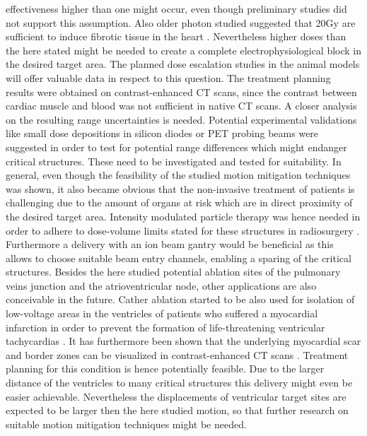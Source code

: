 \documentclass[type=dr, dr=rernat, accentcolor=tud7b,colorbacktitle, bigchapter, openright, twoside, 12pt ]{tudthesis}
\begin{document}
effectiveness higher than one might occur, even though preliminary studies did not support this assumption. Also older photon studied 
suggested that 20Gy are sufficient to induce fibrotic tissue in the heart \cite{Faj70} \cite{Faj73}. 
Nevertheless higher doses than the here stated might be needed to create a complete electrophysiological block in the desired 
target area. The planned dose escalation studies in the animal models will offer valuable data in respect to this question. 
The treatment planning results were obtained on contrast-enhanced CT scans, since the contrast between cardiac muscle 
and blood was not sufficient in native CT scans. A closer analysis on the resulting range uncertainties is needed. Potential 
experimental validations like small dose depositions in silicon diodes \cite{Ben12} or PET probing beams \cite{Lin12} were suggested in order to 
test for potential range differences which might endanger critical structures. These need to be investigated and tested for suitability.\newline
\newline
In general, even though the feasibility of the studied motion mitigation techniques was shown, it also became obvious that the non-invasive 
treatment of patients is challenging due to the amount of organs at risk which are in direct proximity of the desired target area. 
Intensity modulated particle therapy was hence needed in order to adhere to dose-volume limits stated for these structures in radiosurgery \cite{RTOG0631} 
\cite{RTOG0915}. Furthermore a delivery with an ion beam gantry would be beneficial as this allows to choose suitable beam entry channels, 
enabling a sparing of the critical structures.
\newpage
Besides the here studied potential ablation sites of the pulmonary veins junction and the atrioventricular node, other applications are also 
conceivable in the future. Cather ablation started to be also used for isolation of low-voltage areas in the ventricles of patients who 
suffered a myocardial infarction in order to prevent the formation of life-threatening ventricular tachycardias \cite{Til14} \cite{Mad14}. 
It has furthermore been shown that the underlying myocardial scar and border zones can be visualized in contrast-enhanced CT scans \cite{Tia14}. 
Treatment planning for this condition is hence potentially feasible. Due to the larger distance of the ventricles to many critical structures 
this delivery might even be easier achievable. Nevertheless the displacements of ventricular target sites are expected to be larger then the 
here studied motion, so that further research on suitable motion mitigation techniques might be needed. 
\end{document}
